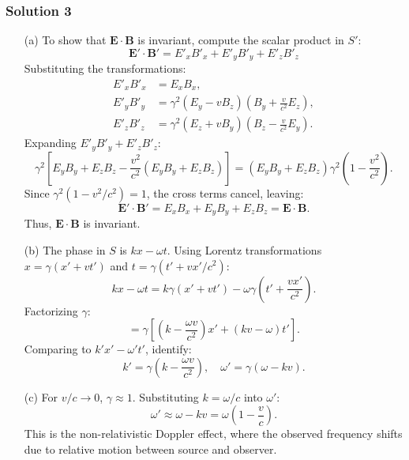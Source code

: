 \documentclass{article}
\begin{document}
\subsubsection{Solution 3}
\begin{enumerate}
    \item[(a)] To show that \(\mathbf{E} \cdot \mathbf{B}\) is invariant, compute the scalar product in \(S'\):
    \[
    \mathbf{E}' \cdot \mathbf{B}' = E'_x B'_x + E'_y B'_y + E'_z B'_z
    \]
    Substituting the transformations:
    \[
    \begin{aligned}
    E'_x B'_x &= E_x B_x, \\
    E'_y B'_y &= \gamma^2 (E_y - v B_z)\left(B_y + \frac{v}{c^2}E_z\right), \\
    E'_z B'_z &= \gamma^2 (E_z + v B_y)\left(B_z - \frac{v}{c^2}E_y\right).
    \end{aligned}
    \]
    Expanding \(E'_y B'_y + E'_z B'_z\):
    \[
    \gamma^2 \left[E_y B_y + E_z B_z - \frac{v^2}{c^2}(E_y B_y + E_z B_z)\right] = (E_y B_y + E_z B_z)\gamma^2\left(1 - \frac{v^2}{c^2}\right).
    \]
    Since \(\gamma^2(1 - v^2/c^2) = 1\), the cross terms cancel, leaving:
    \[
    \mathbf{E}' \cdot \mathbf{B}' = E_x B_x + E_y B_y + E_z B_z = \mathbf{E} \cdot \mathbf{B}.
    \]
    Thus, \(\mathbf{E} \cdot \mathbf{B}\) is invariant.
    
    \item[(b)] The phase in \(S\) is \(kx - \omega t\). Using Lorentz transformations \(x = \gamma(x' + vt')\) and \(t = \gamma(t' + vx'/c^2)\):
    \[
    kx - \omega t = k\gamma(x' + vt') - \omega\gamma\left(t' + \frac{vx'}{c^2}\right).
    \]
    Factorizing \(\gamma\):
    \[
    = \gamma\left[(k - \frac{\omega v}{c^2})x' + (kv - \omega)t'\right].
    \]
    Comparing to \(k'x' - \omega't'\), identify:
    \[
    k' = \gamma\left(k - \frac{\omega v}{c^2}\right), \quad \omega' = \gamma(\omega - kv).
    \]
    
    \item[(c)] For \(v/c \to 0\), \(\gamma \approx 1\). Substituting \(k = \omega/c\) into \(\omega'\):
    \[
    \omega' \approx \omega - k v = \omega\left(1 - \frac{v}{c}\right).
    \]
    This is the non-relativistic Doppler effect, where the observed frequency shifts due to relative motion between source and observer.
\end{enumerate}
\end{document}
